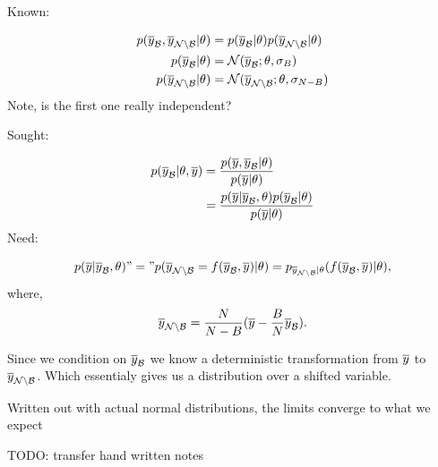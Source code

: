 Known:

\begin{align}
  p(\overline{y}_{\mathcal{B}}, \overline{y}_{\mathcal{N} \setminus \mathcal{B}} | \theta ) &= p(\overline{y}_{\mathcal{B}} | \theta) p(\overline{y}_{\mathcal{N} \setminus \mathcal{B}} | \theta ) \nonumber \\
  p(\overline{y}_{\mathcal{B}} | \theta) &= \mathcal{N}(\overline{y}_{\mathcal{B}}; \theta, \sigma_B) \nonumber \\
  p(\overline{y}_{\mathcal{N} \setminus \mathcal{B}} | \theta) &= \mathcal{N}(\overline{y}_{\mathcal{N} \setminus \mathcal{B}}; \theta, \sigma_{N-B}) \nonumber \\
\end{align}
Note, is the first one really independent?

Sought:

\begin{align}
  p(\yBarB | \theta, \yBar ) &= \frac{p(\yBar, \yBarB | \theta)}{p(\yBar | \theta)}\nonumber \\
                             &= \frac{p(\yBar | \yBarB, \theta) p(\yBarB | \theta) }{p(\yBar | \theta)} \nonumber \\
  \label{eq:pyb_y}
\end{align}
Need:

\begin{align}
  p(\yBar | \yBarB, \theta) "=" p(\yBarNotB
  = f(\yBarB, \yBar)| \theta)
  = p_{\yBarNotB| \theta} (f(\yBarB, \yBar)| \theta),
  \label{eq:py_yb_theta}
\end{align}
where,
\begin{equation}
  \overline{y}_{\mathcal{N} \setminus \mathcal{B}} = \frac{N}{N-B}(\overline{y} - \frac{B}{N} \overline{y}_{\mathcal{B}}).
\end{equation}

Since we condition on $\overline{y}_{\mathcal{B}}$ we know a deterministic transformation from $\overline{y}$ to $\overline{y}_{\mathcal{N} \setminus \mathcal{B}}$.
Which essentialy gives us a distribution over a shifted variable.

Written out with actual normal distributions, the limits converge to what we expect

TODO: transfer hand written notes

